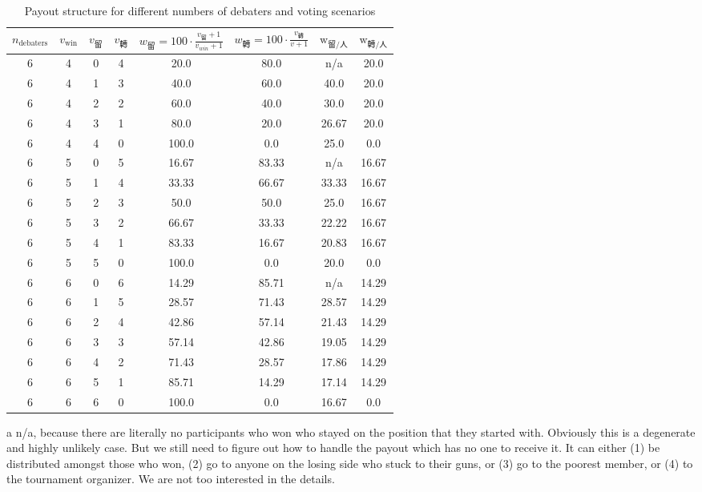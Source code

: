 \begin{table}[H]
    \centering
    \small
    \begin{threeparttable}
    \begin{tabular}{cccccccc}    
    \toprule
    $n_{\text{debaters}}$ & $v_{\text{win}}$ & $v_{\text{留}}$ & $v_{\text{轉}}$ & $w_{\text{留}} = 100 \cdot \frac{v_{\text{留}}+1}{v_{win}+1} $ & $w_{\text{轉}} = 100\cdot\frac{v_{\text{轉}}}{v+1}$ & $\text{w}_{\text{留}/\text{人} }$ & $\text{w}_{\text{轉}/\text{人}}$ \\
    \midrule

6 & 4 & 0 & 4 & 20.0 & 80.0 & n/a\tnote{a} & 20.0 \\
6 & 4 & 1 & 3 & 40.0 & 60.0 & 40.0 & 20.0 \\
6 & 4 & 2 & 2 & 60.0 & 40.0 & 30.0 & 20.0 \\
6 & 4 & 3 & 1 & 80.0 & 20.0 & 26.67 & 20.0 \\
6 & 4 & 4 & 0 & 100.0 & 0.0 & 25.0 & 0.0 \\
6 & 5 & 0 & 5 & 16.67 & 83.33 & n/a\tnote{a} & 16.67 \\
6 & 5 & 1 & 4 & 33.33 & 66.67 & 33.33 & 16.67 \\
6 & 5 & 2 & 3 & 50.0 & 50.0 & 25.0 & 16.67 \\
6 & 5 & 3 & 2 & 66.67 & 33.33 & 22.22 & 16.67 \\
6 & 5 & 4 & 1 & 83.33 & 16.67 & 20.83 & 16.67 \\
6 & 5 & 5 & 0 & 100.0 & 0.0 & 20.0 & 0.0 \\
6 & 6 & 0 & 6 & 14.29 & 85.71 & n/a\tnote{a} & 14.29 \\
6 & 6 & 1 & 5 & 28.57 & 71.43 & 28.57 & 14.29 \\
6 & 6 & 2 & 4 & 42.86 & 57.14 & 21.43 & 14.29 \\
6 & 6 & 3 & 3 & 57.14 & 42.86 & 19.05 & 14.29 \\
6 & 6 & 4 & 2 & 71.43 & 28.57 & 17.86 & 14.29 \\
6 & 6 & 5 & 1 & 85.71 & 14.29 & 17.14 & 14.29 \\
6 & 6 & 6 & 0 & 100.0 & 0.0 & 16.67 & 0.0 \\
\bottomrule
\end{tabular}
\begin{tablenotes}
    \item[a] n/a, because there are literally no participants who won who stayed on the position that they started with. 
    Obviously this is a degenerate and highly unlikely case. But we still need to figure out how to handle the payout which has no one to receive it. It can either (1) be distributed amongst those who won, (2) go to anyone on the losing side who stuck to their guns, or (3) go to the poorest member, or (4) to the tournament organizer. We are not too interested in the details. 
\end{tablenotes}
\end{threeparttable}

\caption{Payout structure for different numbers of debaters and voting scenarios}
\end{table}

